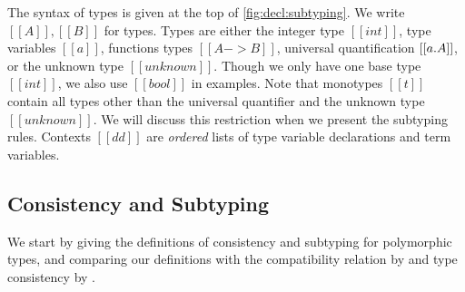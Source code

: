 The syntax of types is given at the top of
\cref{fig:decl:subtyping}.
We write $[[A]], [[B]]$ for types. Types are either the integer type $[[int]]$, type
variables $[[a]]$, functions types $[[A -> B]]$, universal quantification $[[ \/a . A ]]$, or
the unknown type $[[unknown]]$. Though we only have one base type $[[int]]$, we
also use $[[bool]]$ in examples. Note that monotypes $[[t]]$ contain all
types other than the universal quantifier and the unknown type $[[unknown]]$. %
We will discuss this restriction when we present the subtyping rules.
Contexts $[[dd]]$ are \emph{ordered} lists of type variable declarations and term variables.



\subsection{Consistency and Subtyping}
\label{subsec:consistency-subtyping}

We start by giving the definitions of consistency and subtyping for polymorphic
types, and comparing our definitions with the compatibility relation by
\citet{ahmed2011blame} and type consistency by \citet{yuu2017poly}.

